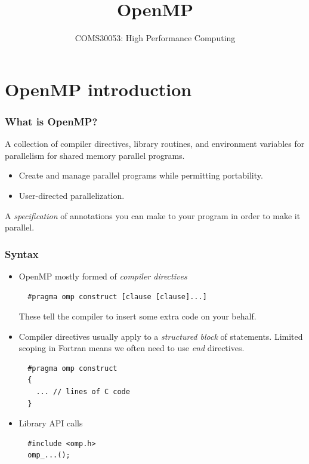 \documentclass[aspectratio=169]{beamer}
\title{OpenMP}
\subtitle{COMS30053: High Performance Computing}
\begin{document}
\frame{\titlepage}

\section{OpenMP introduction}
\begin{frame}
\frametitle{What is OpenMP?}

A collection of compiler directives, library routines, and environment variables for parallelism for shared memory parallel programs.

\begin{itemize}
  \item Create and manage parallel programs while permitting portability.
  \item User-directed parallelization.
\end{itemize}

A \emph{specification} of annotations you can make to your program in order to make it parallel.

\end{frame}

\begin{frame}[fragile]
\frametitle{Syntax}
\begin{itemize}
\item OpenMP mostly formed of \emph{compiler directives}\\
  \begin{verbatim}
  #pragma omp construct [clause [clause]...]
  \end{verbatim}
  These tell the compiler to insert some extra code on your behalf.

\item Compiler directives usually apply to a \emph{structured block} of statements.
Limited scoping in Fortran means we often need to use \emph{end} directives.
  \begin{verbatim}
  #pragma omp construct
  {
    ... // lines of C code
  }
  \end{verbatim}

\item Library API calls
  \begin{verbatim}
  #include <omp.h>
  omp_...();
  \end{verbatim}

\end{itemize}
\end{frame}
\end{document}
